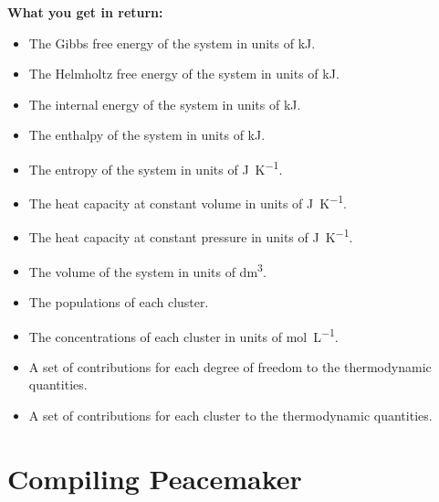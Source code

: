 \documentclass{scrartcl}
\begin{document}
\textbf{What you get in return:}\vspace{-0.2cm}
\begin{itemize}[noitemsep]
    \item The Gibbs free energy of the system in units of \si{\kilo\joule}.
    \item The Helmholtz free energy of the system in units of \si{\kilo\joule}.
    \item The internal energy of the system in units of \si{\kilo\joule}.
    \item The enthalpy of the system in units of \si{\kilo\joule}.
    \item The entropy of the system in units of \si{\joule\per\kelvin}.
    \item The heat capacity at constant volume in units of \si{\joule\per\kelvin}.
    \item The heat capacity at constant pressure in units of \si{\joule\per\kelvin}.
    \item The volume of the system in units of \si{\deci\meter\cubed}.
    \item The populations of each cluster.
    \item The concentrations of each cluster in units of \si{\mole\per\liter}.
    \item A set of contributions for each degree of freedom to the thermodynamic quantities.
    \item A set of contributions for each cluster to the thermodynamic quantities.
\end{itemize}\vspace{0.32cm}

\begin{figure}[h!]
    \centering
    \label{fig:peacemaker}
\end{figure}

\newpage
\section{Compiling Peacemaker}
\end{document}
